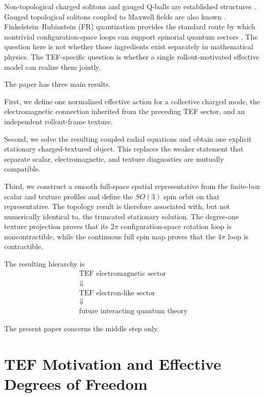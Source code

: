 \documentclass[11pt]{article}
\begin{document}
Non-topological charged solitons and gauged Q-balls are established structures \cite{Coleman1985,Lee1989,HanSu2023}. Gauged topological solitons coupled to Maxwell fields are also known \cite{Livramento2023}. Finkelstein--Rubinstein (FR) quantization provides the standard route by which nontrivial configuration-space loops can support spinorial quantum sectors \cite{Giulini1993,Krusch2003,Krusch2006,CorkHarland2024}. The question here is not whether those ingredients exist separately in mathematical physics. The TEF-specific question is whether a single rollout-motivated effective model can realize them jointly.

The paper has three main results.

First, we define one normalized effective action for a collective charged mode, the electromagnetic connection inherited from the preceding TEF sector, and an independent rollout-frame texture.

Second, we solve the resulting coupled radial equations and obtain one explicit stationary charged-textured object. This replaces the weaker statement that separate scalar, electromagnetic, and texture diagnostics are mutually compatible.

Third, we construct a smooth full-space spatial representative from the finite-box scalar and texture profiles and define the \(SO(3)\) spin orbit on that representative. The topology result is therefore associated with, but not numerically identical to, the truncated stationary solution. The degree-one texture projection proves that its \(2\pi\) configuration-space rotation loop is noncontractible, while the continuous full spin map proves that the \(4\pi\) loop is contractible.

The resulting hierarchy is
\begin{equation}
\boxed{
\begin{gathered}
\text{TEF electromagnetic sector}\\[-0.15em]
\Downarrow\\[-0.15em]
\text{TEF electron-like sector}\\[-0.15em]
\Downarrow\\[-0.15em]
\text{future interacting quantum theory}
\end{gathered}
}
\end{equation}

The present paper concerns the middle step only.

\section{TEF Motivation and Effective Degrees of Freedom}
\end{document}
